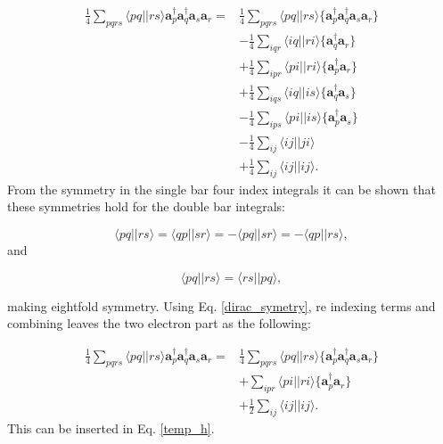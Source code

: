 \documentclass[a4paper,norsk,11pt,twoside]{report}
\begin{document}
\begin{align}
\frac{1}{4} \sum_{pqrs} \langle pq||rs \rangle \textbf{a}^{\dag}_p \textbf{a}^{\dag}_q \textbf{a}_s \textbf{a}_r = &
\frac{1}{4}
\sum_{pqrs} \langle pq||rs \rangle \{\textbf{a}^{\dag}_p \textbf{a}^{\dag}_q \textbf{a}_s \textbf{a}_r\}
\nonumber \\ &
- \frac{1}{4} \sum_{iqr} \langle iq||ri \rangle \{\textbf{a}^{\dag}_q \textbf{a}_r \} \nonumber \\ &
+ \frac{1}{4} \sum_{ipr} \langle pi||ri \rangle \{\textbf{a}^{\dag}_p \textbf{a}_r \} \nonumber \\ &
+ \frac{1}{4} \sum_{iqs} \langle iq||is \rangle \{\textbf{a}^{\dag}_q \textbf{a}_s \} \nonumber \\ &
- \frac{1}{4} \sum_{ips} \langle pi||is \rangle \{\textbf{a}^{\dag}_p \textbf{a}_s \} \nonumber \\ &
- \frac{1}{4} \sum_{ij} \langle ij||ji \rangle \nonumber \\ &
+ \frac{1}{4} \sum_{ij} \langle ij||ij \rangle . \nonumber
\end{align}
From the symmetry in the single bar four index integrals it can be shown that these symmetries hold for the double bar integrals:

\begin{equation}
\langle pq||rs \rangle =
\langle qp||sr \rangle =
- \langle pq||sr \rangle =
- \langle qp || rs \rangle , \label{dirac_symetry}
\end{equation}
and 

\begin{equation}
\langle pq || rs \rangle = \langle rs || pq \rangle ,
\end{equation}

making eightfold symmetry. Using Eq. \eqref{dirac_symetry}, re indexing terms and combining leaves the two electron part as the following:

\begin{align}
\frac{1}{4} \sum_{pqrs} \langle pq||rs \rangle \textbf{a}^{\dag}_p \textbf{a}^{\dag}_q \textbf{a}_s \textbf{a}_r = & \frac{1}{4}
\sum_{pqrs} \langle pq||rs \rangle \{\textbf{a}^{\dag}_p \textbf{a}^{\dag}_q \textbf{a}_s \textbf{a}_r\}
 \\ &
+ \sum_{ipr} \langle pi||ri \rangle \{\textbf{a}^{\dag}_p \textbf{a}_r \} \nonumber \\ &
+ \frac{1}{2} \sum_{ij} \langle ij||ij \rangle . \nonumber
\end{align}
This can be inserted in Eq. \eqref{temp_h}.
\end{document}
